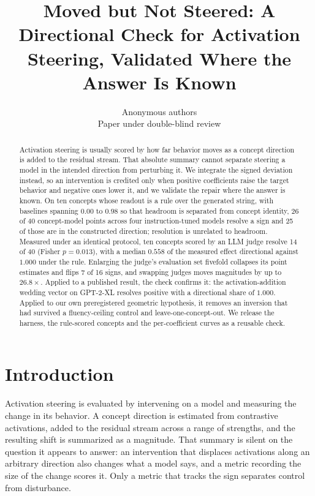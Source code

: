 \documentclass{article}
\title{Moved but Not Steered: A Directional Check for
Activation Steering, Validated Where the Answer Is Known}
\author{%
  Anonymous authors \\
  Paper under double-blind review
}
\begin{document}
\maketitle

\begin{abstract}
Activation steering is usually scored by how far behavior moves as a concept
direction is added to the residual stream. That absolute summary cannot
separate steering a model in the intended direction from perturbing it. We
integrate the signed deviation instead, so an intervention is credited only when
positive coefficients raise the target behavior and negative ones lower it, and
we validate the repair where the answer is known. On ten concepts whose readout
is a rule over the generated string, with baselines spanning $0.00$ to $0.98$ so
that headroom is separated from concept identity, 26 of 40 concept-model points
across four instruction-tuned models resolve a sign and 25 of those are in the
constructed direction; resolution is unrelated to headroom. Measured under an
identical protocol, ten concepts scored by an LLM judge resolve 14 of 40 (Fisher
$p=0.013$), with a median $0.558$ of the measured effect directional against
$1.000$ under the rule. Enlarging the judge's evaluation set fivefold collapses
its point estimates and flips 7 of 16 signs, and swapping judges moves
magnitudes by up to $26.8\times$. Applied to a published result, the check
confirms it: the activation-addition wedding vector on GPT-2-XL resolves
positive with a directional share of $1.000$. Applied to our own preregistered
geometric hypothesis, it removes an inversion that had survived a
fluency-ceiling control and leave-one-concept-out. We release the harness, the
rule-scored concepts and the per-coefficient curves as a reusable check.
\end{abstract}

\section{Introduction}

Activation steering is evaluated by intervening on a model and measuring the
change in its behavior. A concept direction is estimated from contrastive
activations, added to the residual stream across a range of strengths, and the
resulting shift is summarized as a magnitude. That summary is silent on the
question it appears to answer: an intervention that displaces activations along
an arbitrary direction also changes what a model says, and a metric recording
the size of the change scores it. Only a metric that tracks the sign separates
control from disturbance.
\end{document}
